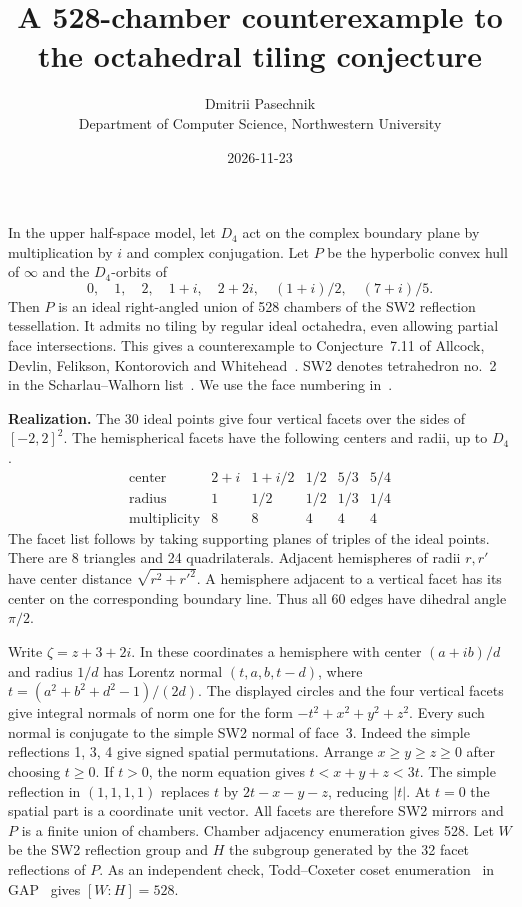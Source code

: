 \documentclass[11pt]{article}
\title{\Large A 528-chamber counterexample to the octahedral tiling conjecture}
\author{Dmitrii Pasechnik\\[2pt]
  \normalsize Department of Computer Science, Northwestern University}
\date{2026-11-23}
\begin{document}
\maketitle

In the upper half-space model, let \(D_4\) act on the complex boundary plane by multiplication by \(i\) and complex conjugation. Let \(P\) be the hyperbolic convex hull of \(\infty\) and the \(D_4\)-orbits of
\[
0,\quad 1,\quad 2,\quad 1+i,\quad 2+2i,\quad (1+i)/2,\quad (7+i)/5 .
\]
Then \(P\) is an ideal right-angled union of 528 chambers of the SW2 reflection tessellation. It admits no tiling by regular ideal octahedra, even allowing partial face intersections. This gives a counterexample to Conjecture~7.11 of Allcock, Devlin, Felikson, Kontorovich and Whitehead~\cite[\S7.4]{adfkw}. SW2 denotes tetrahedron no.~2 in the Scharlau--Walhorn list~\cite{sw}. We use the face numbering in~\cite[Appendix~B]{adfkw}.

\textbf{Realization.} The 30 ideal points give four vertical facets over the sides of \([-2,2]^2\). The hemispherical facets have the following centers and radii, up to \(D_4\).
\[
\begin{array}{c|ccccc}
\text{center}&2+i&1+i/2&1/2&5/3&5/4\\
\text{radius}&1&1/2&1/2&1/3&1/4\\
\text{multiplicity}&8&8&4&4&4
\end{array}
\]
The facet list follows by taking supporting planes of triples of the ideal points. There are 8 triangles and 24 quadrilaterals. Adjacent hemispheres of radii \(r,r'\) have center distance \(\sqrt{r^2+r'^2}\). A hemisphere adjacent to a vertical facet has its center on the corresponding boundary line. Thus all 60 edges have dihedral angle \(\pi/2\).

Write \(\zeta=z+3+2i\). In these coordinates a hemisphere with center \((a+ib)/d\) and radius \(1/d\) has Lorentz normal \((t,a,b,t-d)\), where \(t=(a^2+b^2+d^2-1)/(2d)\). The displayed circles and the four vertical facets give integral normals of norm one for the form \(-t^2+x^2+y^2+z^2\). Every such normal is conjugate to the simple SW2 normal of face~3. Indeed the simple reflections 1, 3, 4 give signed spatial permutations. Arrange \(x\geq y\geq z\geq0\) after choosing \(t\geq0\). If \(t>0\), the norm equation gives \(t<x+y+z<3t\). The simple reflection in \((1,1,1,1)\) replaces \(t\) by \(2t-x-y-z\), reducing \(\lvert t\rvert\). At \(t=0\) the spatial part is a coordinate unit vector. All facets are therefore SW2 mirrors and \(P\) is a finite union of chambers. Chamber adjacency enumeration gives 528. Let \(W\) be the SW2 reflection group and \(H\) the subgroup generated by the 32 facet reflections of \(P\). As an independent check, Todd--Coxeter coset enumeration~\cite{tc} in GAP~\cite{gap} gives \([W:H]=528\).
\end{document}
